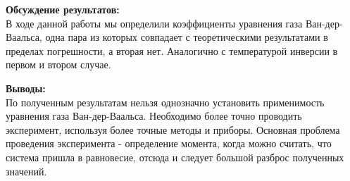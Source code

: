 \documentclass[a4paper, 12pt]{article}%
\begin{document}
	\textbf{Обсуждение результатов: }\\
	В ходе данной работы мы определили коэффициенты уравнения газа  Ван-дер-Ваальса, одна пара из которых совпадает с теоретическими результатами в пределах погрешности, а вторая нет. Аналогично с температурой инверсии в первом и втором случае.  


\textbf{Выводы: }\\
По полученным результатам нельзя однозначно установить применимость уравнения газа  Ван-дер-Ваальса. Необходимо более точно проводить эксперимент, используя более точные методы и приборы. Основная проблема проведения эксперимента - определение момента, когда можно считать, что система пришла в равновесие, отсюда и следует большой разброс полученных значений.


	
\end{document}
